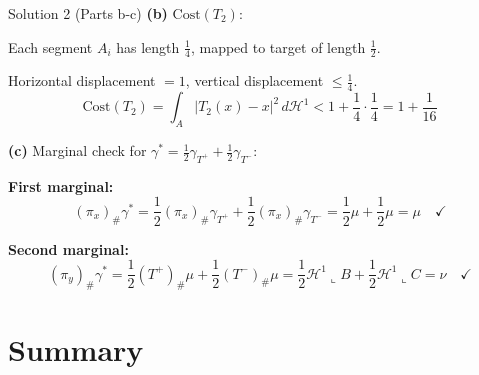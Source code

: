 \documentclass[aspectratio=169]{beamer}
\newcommand{\Hone}{\mathcal{H}^1}
\begin{document}
\begin{frame}{Solution 2 (Parts b-c)}
\textbf{(b)} $\text{Cost}(T_2)$:

Each segment $A_i$ has length $\frac{1}{4}$, mapped to target of length $\frac{1}{2}$.

Horizontal displacement $= 1$, vertical displacement $\leq \frac{1}{4}$.
\[
\text{Cost}(T_2) = \int_A |T_2(x) - x|^2 \, d\Hone < 1 + \frac{1}{4} \cdot \frac{1}{4} = 1 + \frac{1}{16}
\]

\vspace{0.3cm}
\textbf{(c)} Marginal check for $\gamma^* = \frac{1}{2}\gamma_{T^+} + \frac{1}{2}\gamma_{T^-}$:

\textbf{First marginal:}
\[
(\pi_x)_\# \gamma^* = \frac{1}{2}(\pi_x)_\# \gamma_{T^+} + \frac{1}{2}(\pi_x)_\# \gamma_{T^-} = \frac{1}{2}\mu + \frac{1}{2}\mu = \mu \quad \checkmark
\]

\textbf{Second marginal:}
\[
(\pi_y)_\# \gamma^* = \frac{1}{2}(T^+)_\# \mu + \frac{1}{2}(T^-)_\# \mu = \frac{1}{2}\Hone \llcorner B + \frac{1}{2}\Hone \llcorner C = \nu \quad \checkmark
\]
\end{frame}

\section{Summary}
\end{document}
